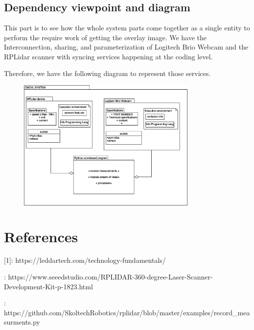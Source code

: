 \documentclass[10pt,draftclsnofoot,onecolumn,journal,compsoc]{IEEEtran}
\begin{document}
      
  
      
  \subsection{Dependency viewpoint and diagram}
  This part is to see how the whole system parts come together as a single entity to perform the require work of getting the overlay image. We have the Interconnection, sharing, and
parameterization of Logitech Brio Webcam and the RPLidar scanner with syncing services happening at the  coding level.

Therefore, we have the following diagram to represent those services.

	\begin{figure}[ht]
			
    \centering \includegraphics[width=3.5in,natwidth=4000,natheight=400]{images/diagrampackages.eps}
    	\end{figure}



      
      \section{References}
[1]: {https://leddartech.com/technology-fundamentals/}   \par	
[2]: {https://www.seeedstudio.com/RPLIDAR-360-degree-Laser-Scanner-Development-Kit-p-1823.html}\par
[3]: {https://github.com/SkoltechRobotics/rplidar/blob/master/examples/record\_measurments.py}
 
\end{document}
